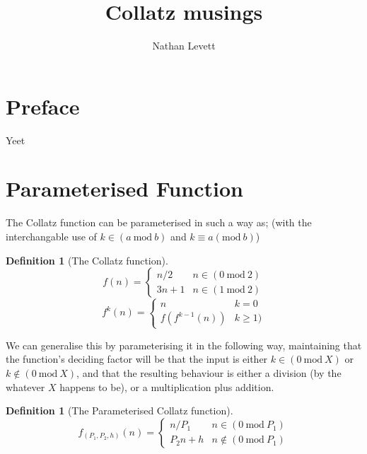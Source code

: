 \documentclass[12pt,a4paper]{amsart}
\author{Nathan Levett}
\title{Collatz musings}
\numberwithin{equation}{section}
\theoremstyle{plain}
\theoremstyle{definition}
\newtheorem{Def}[Th]{Definition}
\begin{document}
	
\tableofcontents

\section{Preface}
	Yeet

\section{Parameterised Function}

The Collatz function can be parameterised in such a way as; (with the interchangable use of $k \in \left ( a\:\mathrm{mod}\:b \right )$ and $k \equiv a \left ( \mathrm{mod}\:b \right )$) 

\begin{Def}[The Collatz function]
\begin{equation}
f\left ( n \right )=\left\{\begin{matrix}
n/2  & n \in \left ( 0\:\mathrm{mod}\:2 \right ) \\ 
3n+1 & n \in \left ( 1\:\mathrm{mod}\:2 \right )
\end{matrix}\right.
\end{equation}
\begin{equation}
f^{k}\left ( n \right )=\left\{\begin{matrix}
n & k=0 \\ 
f\left ( f^{k-1}\left ( n \right ) \right ) & k \geq 1 )
\end{matrix}\right.
\end{equation}
\end{Def}

We can generalise this by parameterising it in the following way, maintaining that the function's deciding factor will be that the input is either $k \in \left ( 0\:\mathrm{mod}\:X \right )$ or $k \notin \left ( 0\:\mathrm{mod}\:X \right )$, and that the resulting behaviour is either a division (by the whatever $X$ happens to be), or a multiplication plus addition.

\begin{Def}[The Parameterised Collatz function]
\begin{equation}
f_{\left (P_{1},P_{2},h\right )}\left ( n \right )=\left\{\begin{matrix}
n/P_{1}  & n \in \left ( 0\:\mathrm{mod}\:P_{1} \right ) \\ 
P_{2}n+h & n \notin \left ( 0\:\mathrm{mod}\:P_{1} \right )
\end{matrix}\right.
\end{equation}
\end{Def}
\end{document}
